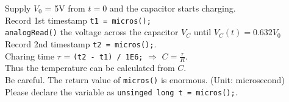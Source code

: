 Supply $V_0$ = 5V from $t=0$ and the capacitor starts charging.\\
Record 1st timestamp \texttt{t1 = micros();}\\

\texttt{analogRead()} the voltage across the capacitor $V_C$ until $V_C(t) = 0.632 V_0$\\
Record 2nd timestamp \texttt{t2 = micros();}.\\

Charing time $\tau$ = \texttt{(t2 - t1) / 1E6;} $\Longrightarrow$ $C = \frac{\tau}{R}$.\\

Thus the temperature can be calculated from $C$.\\

Be careful. The return value of \texttt{micros()} is enormous. (Unit: microsecond)\\
Please declare the variable as \texttt{unsinged long t = micros();}.
